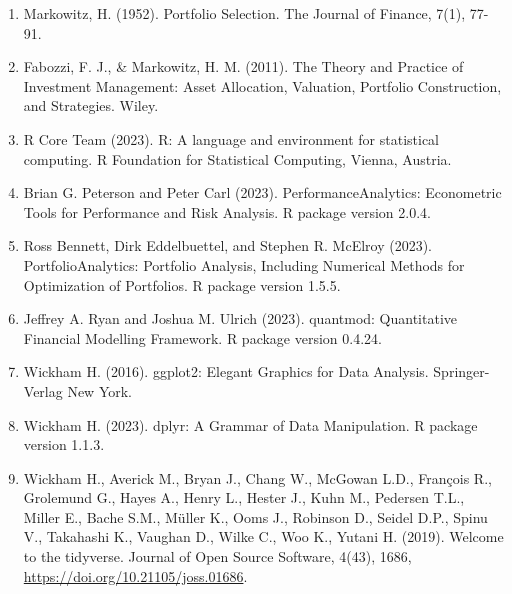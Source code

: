 \documentclass[
]{article}
\providecommand{\tightlist}{%
  \setlength{\itemsep}{0pt}\setlength{\parskip}{0pt}}
\begin{document}
\begin{enumerate}
\def\labelenumi{\arabic{enumi}.}
\tightlist
\item
  Markowitz, H. (1952). Portfolio Selection. The Journal of Finance,
  7(1), 77-91.
\item
  Fabozzi, F. J., \& Markowitz, H. M. (2011). The Theory and Practice of
  Investment Management: Asset Allocation, Valuation, Portfolio
  Construction, and Strategies. Wiley.
\item
  R Core Team (2023). R: A language and environment for statistical
  computing. R Foundation for Statistical Computing, Vienna, Austria.
\item
  Brian G. Peterson and Peter Carl (2023). PerformanceAnalytics:
  Econometric Tools for Performance and Risk Analysis. R package version
  2.0.4.
\item
  Ross Bennett, Dirk Eddelbuettel, and Stephen R. McElroy (2023).
  PortfolioAnalytics: Portfolio Analysis, Including Numerical Methods
  for Optimization of Portfolios. R package version 1.5.5.
\item
  Jeffrey A. Ryan and Joshua M. Ulrich (2023). quantmod: Quantitative
  Financial Modelling Framework. R package version 0.4.24.
\item
  Wickham H. (2016). ggplot2: Elegant Graphics for Data Analysis.
  Springer-Verlag New York.
\item
  Wickham H. (2023). dplyr: A Grammar of Data Manipulation. R package
  version 1.1.3.
\item
  Wickham H., Averick M., Bryan J., Chang W., McGowan L.D., François R.,
  Grolemund G., Hayes A., Henry L., Hester J., Kuhn M., Pedersen T.L.,
  Miller E., Bache S.M., Müller K., Ooms J., Robinson D., Seidel D.P.,
  Spinu V., Takahashi K., Vaughan D., Wilke C., Woo K., Yutani H.
  (2019). Welcome to the tidyverse. Journal of Open Source Software,
  4(43), 1686, \url{https://doi.org/10.21105/joss.01686}.
\end{enumerate}
\end{document}
